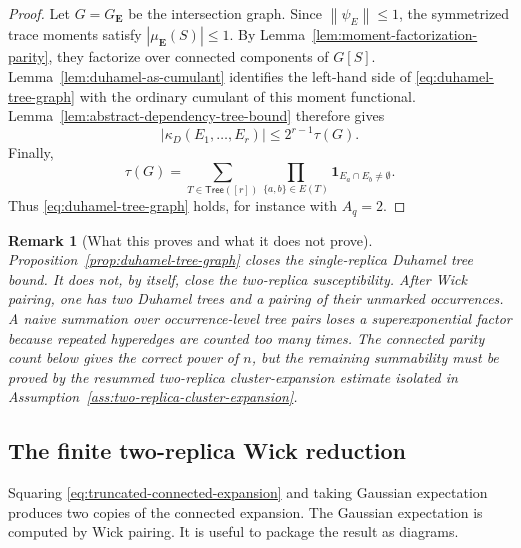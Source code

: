 \documentclass[11pt]{article}
\newtheorem{remark}[theorem]{Remark}
\newcommand{\ind}{\mathbf{1}}
\newcommand{\norm}[1]{\left\lVert #1\right\rVert}
\begin{document}
\begin{proof}
  Let $G=G_{\mathbf E}$ be the intersection graph.  Since
  $\norm{\psi_E}\leq1$, the symmetrized trace moments satisfy
  $|\mu_{\mathbf E}(S)|\leq1$.  By
  Lemma~\ref{lem:moment-factorization-parity}, they factorize over connected
  components of $G[S]$.  Lemma~\ref{lem:duhamel-as-cumulant} identifies the
  left-hand side of \eqref{eq:duhamel-tree-graph} with the ordinary cumulant of
  this moment functional.  Lemma~\ref{lem:abstract-dependency-tree-bound}
  therefore gives
  \begin{equation}\label{eq:duhamel-tree-proof-final}
    |\kappa_D(E_1,\ldots,E_r)|
    \leq
    2^{r-1}\tau(G).
  \end{equation}
  Finally,
  \begin{equation}\label{eq:tau-expanded-tree-sum}
    \tau(G)
    =
    \sum_{T\in\mathsf{Tree}([r])}
    \prod_{\{a,b\}\in E(T)}
    \ind_{E_a\cap E_b\neq\emptyset}.
  \end{equation}
  Thus \eqref{eq:duhamel-tree-graph} holds, for instance with $A_q=2$.
\end{proof}

\begin{remark}[What this proves and what it does not prove]
  Proposition~\ref{prop:duhamel-tree-graph} closes the single-replica
  Duhamel tree bound.  It does not, by itself, close the two-replica
  susceptibility.  After Wick pairing, one has two Duhamel trees and a pairing
  of their unmarked occurrences.  A naive summation over occurrence-level tree
  pairs loses a superexponential factor because repeated hyperedges are counted
  too many times.  The connected parity count below gives the correct power of
  $n$, but the remaining summability must be proved by the resummed
  two-replica cluster-expansion estimate isolated in
  Assumption~\ref{ass:two-replica-cluster-expansion}.
\end{remark}

\subsection{The finite two-replica Wick reduction}

Squaring \eqref{eq:truncated-connected-expansion} and taking Gaussian
expectation produces two copies of the connected expansion.  The Gaussian
expectation is computed by Wick pairing.  It is useful to package the result as
diagrams.
\end{document}
